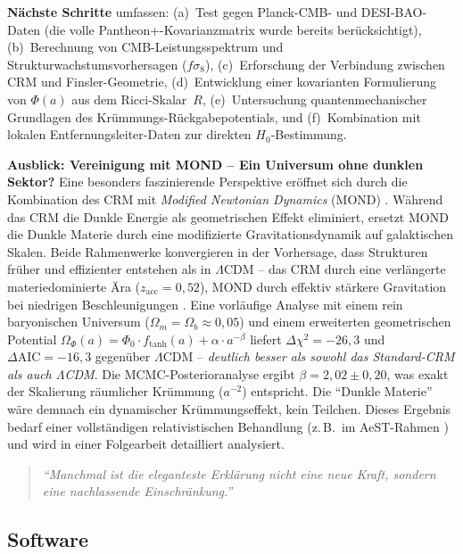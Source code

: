 \documentclass[aps,prd,twocolumn,superscriptaddress,nofootinbib]{revtex4-2}
\begin{document}
\textbf{N\"achste Schritte} umfassen: (a)~Test gegen Planck-CMB- und DESI-BAO-Daten (die volle Pantheon+-Kovarianzmatrix wurde bereits ber\"ucksichtigt), (b)~Berechnung von CMB-Leistungsspektrum und Strukturwachstumsvorhersagen ($f\sigma_8$), (c)~Erforschung der Verbindung zwischen CRM und Finsler-Geometrie, (d)~Entwicklung einer kovarianten Formulierung von $\Phi(a)$ aus dem Ricci-Skalar~$R$, (e)~Untersuchung quantenmechanischer Grundlagen des Kr\"ummungs-R\"uckgabepotentials, und (f)~Kombination mit lokalen Entfernungsleiter-Daten zur direkten $H_0$-Bestimmung.

\textbf{Ausblick: Vereinigung mit MOND -- Ein Universum ohne dunklen Sektor?} Eine besonders faszinierende Perspektive er\"offnet sich durch die Kombination des CRM mit \textit{Modified Newtonian Dynamics} (MOND) \cite{Milgrom1983}. W\"ahrend das CRM die Dunkle Energie als geometrischen Effekt eliminiert, ersetzt MOND die Dunkle Materie durch eine modifizierte Gravitationsdynamik auf galaktischen Skalen. Beide Rahmenwerke konvergieren in der Vorhersage, dass Strukturen fr\"uher und effizienter entstehen als in $\Lambda$CDM -- das CRM durch eine verl\"angerte materiedominierte \"Ara ($z_{\mathrm{acc}} = 0{,}52$), MOND durch effektiv st\"arkere Gravitation bei niedrigen Beschleunigungen \cite{Asencio2023}. Eine vorl\"aufige Analyse mit einem rein baryonischen Universum ($\Omega_m = \Omega_b \approx 0{,}05$) und einem erweiterten geometrischen Potential $\Omega_\Phi(a) = \Phi_0 \cdot f_{\mathrm{tanh}}(a) + \alpha \cdot a^{-\beta}$ liefert $\Delta\chi^2 = -26{,}3$ und $\Delta\mathrm{AIC} = -16{,}3$ gegen\"uber $\Lambda$CDM -- \textit{deutlich besser als sowohl das Standard-CRM als auch $\Lambda$CDM}. Die MCMC-Posterioranalyse ergibt $\beta = 2{,}02 \pm 0{,}20$, was exakt der Skalierung r\"aumlicher Kr\"ummung ($a^{-2}$) entspricht. Die ``Dunkle Materie'' w\"are demnach ein dynamischer Kr\"ummungseffekt, kein Teilchen. Dieses Ergebnis bedarf einer vollst\"andigen relativistischen Behandlung (z.\,B.\ im AeST-Rahmen \cite{Skordis2021}) und wird in einer Folgearbeit detailliert analysiert.

\begin{quote}
\textit{``Manchmal ist die eleganteste Erkl\"arung nicht eine neue Kraft, sondern eine nachlassende Einschr\"ankung.''}
\end{quote}

\subsection*{Software}
\end{document}
